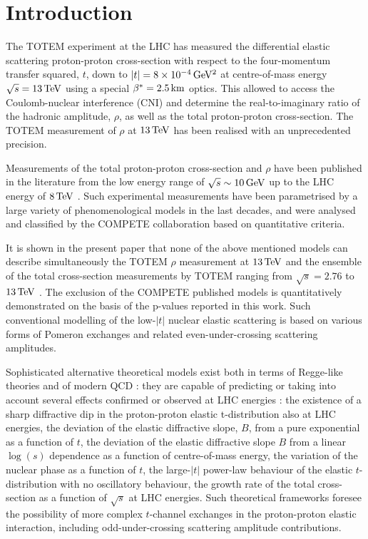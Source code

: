 \section{Introduction}
\label{sec:introduction}

The TOTEM experiment at the LHC has measured the differential elastic scattering proton-proton cross-section with respect to the four-momentum transfer squared, $t$, down to $|t| = 8\times10^{-4}\,{\rm GeV^2}$ at centre-of-mass energy $\sqrt s = 13\,{\rm TeV}$ using a special $\beta^* = 2.5\,{\rm km}$ optics. This allowed to access the Coulomb-nuclear interference (CNI) and determine the real-to-imaginary ratio of the hadronic amplitude, $\rho$, as well as the total proton-proton cross-section. The TOTEM measurement of $\rho$ at $13\,{\rm TeV}$ has been realised with an unprecedented precision. %

Measurements of the total proton-proton cross-section and $\rho$ have been published in the literature from the low energy range of $\sqrt s \sim 10\,{\rm GeV}$ up to the LHC energy of $8\,{\rm TeV}$ \cite{pdg}. Such experimental measurements have been parametrised by a large variety of phenomenological models in the last decades, and were analysed and classified by the COMPETE collaboration \cite{compete} based on quantitative criteria.

It is shown in the present paper that none of the above mentioned models can describe simultaneously the TOTEM $\rho$ measurement at $13\,{\rm TeV}$ and the ensemble of the total cross-section measurements by TOTEM ranging from $\sqrt s = 2.76$ to $13\,{\rm TeV}$ \cite{totem-7tev-tot2,totem-8tev-90m,totem-8tev-1km,totem-13tev-90m}. The exclusion of the COMPETE published models is quantitatively demonstrated on the basis of the p-values reported in this work. Such conventional modelling of the low-$|t|$ nuclear elastic scattering is based on various forms of Pomeron exchanges and related even-under-crossing scattering amplitudes.

Sophisticated alternative theoretical models exist both in terms of Regge-like theories \cite{nicolescu-1990} and of modern QCD \cite{braun}: they are capable of predicting or taking into account several effects confirmed or observed at LHC energies \cite{totem-7tev-first,totem-8tev-90m}: the existence of a sharp diffractive dip in the proton-proton elastic t-distribution also at LHC energies, the deviation of the elastic diffractive slope, $B$, from a pure exponential as a function of $t$, the deviation of the elastic diffractive slope $B$ from a linear $\log(s)$ dependence as a function of centre-of-mass energy, the variation of the nuclear phase as a function of $t$, the large-$|t|$ power-law behaviour of the elastic $t$-distribution with no oscillatory behaviour, the growth rate of the total cross-section as a function of $\sqrt s$ at LHC energies. Such theoretical frameworks foresee the possibility of more complex $t$-channel exchanges in the proton-proton elastic interaction, including odd-under-crossing scattering amplitude contributions.

